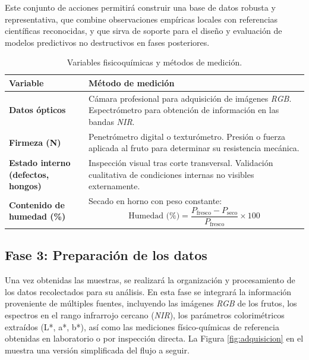 Este conjunto de acciones permitirá construir una base de datos robusta y representativa, que combine observaciones empíricas locales con referencias científicas reconocidas, y que sirva de soporte para el diseño y evaluación de modelos predictivos no destructivos en fases posteriores.

\begin{table}[h]
\centering
\footnotesize
\begin{tabular}{|p{4.5cm}|p{9cm}|}
\hline
\textbf{Variable} & \textbf{Método de medición} \\
\hline

\textbf{Datos ópticos} &
Cámara profesional para adquisición de imágenes \textit{RGB}. Espectrómetro para obtención de información en las bandas \textit{NIR}. \\
\hline

\textbf{Firmeza (N)} &
Penetrómetro digital o texturómetro. Presión o fuerza aplicada al fruto para determinar su resistencia mecánica. \\
\hline

\textbf{Estado interno (defectos, hongos)} &
Inspección visual tras corte transversal. Validación cualitativa de condiciones internas no visibles externamente. \\
\hline

\textbf{Contenido de humedad (\%)} &
Secado en horno con peso constante:
\[
\text{Humedad (\%)} = \frac{P_{\text{fresco}} - P_{\text{seco}}}{P_{\text{fresco}}} \times 100
\]
\\
\hline

\end{tabular}
\caption{Variables fisicoquímicas y métodos de medición.}
\label{tab:metodos}
\end{table}

\subsection{Fase 3: Preparación de los datos}

Una vez obtenidas las muestras, se realizará la organización y procesamiento de los datos recolectados para su análisis. En esta fase se integrará la información proveniente de múltiples fuentes, incluyendo las imágenes \textit{RGB} de los frutos, los espectros en el rango infrarrojo cercano (\textit{NIR}), los parámetros colorimétricos extraídos (L*, a*, b*), así como las mediciones físico-químicas de referencia obtenidas en laboratorio o por inspección directa. La Figura \ref{fig:adquisicion} en el  muestra una versión simplificada del flujo a seguir.\\

